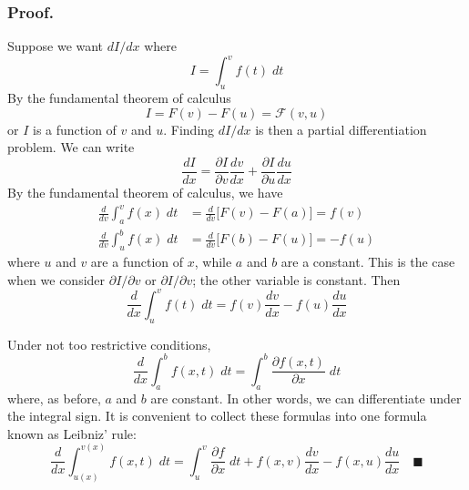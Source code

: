 \documentclass[../../../main.tex]{subfiles}
\begin{document}
\subsubsection{Proof.} Suppose we want $dI/dx$ where
\begin{equation*}
    I=\int_{u }^{v }f(t)\;dt
\end{equation*}
By the fundamental theorem of calculus
\begin{equation*}
    I=F(v)-F(u)=\mathcal{F}(v,u)
\end{equation*}
or $I$ is a function of $v$ and $u$. Finding $dI/dx$ is then a partial diﬀerentiation problem. We can write
\begin{equation*}
    \frac{dI}{dx}=\frac{\partial I}{\partial v}\frac{dv}{dx}+\frac{\partial I}{\partial u}\frac{du}{dx}
\end{equation*}
By the fundamental theorem of calculus, we have
\begin{align*}
    \frac{d}{dv}\int_{a}^{v}f(x)\;dt & =\frac{d}{dv}\bigl[F(v)-F(a)\bigr]=f(v)  \\
    \frac{d}{dv}\int_{u}^{b}f(x)\;dt & =\frac{d}{dv}\bigl[F(b)-F(u)\bigr]=-f(u)
\end{align*}
where $u$ and $v$ are a function of $x$, while $a$ and $b$ are a constant. This is the case when we consider $\partial I/\partial v$ or $\partial I/\partial v$; the other variable is constant. Then
\begin{equation*}
    \frac{d}{dx}\int_{u }^{v }f(t)\;dt=f(v)\frac{dv}{dx}-f(u)\frac{du}{dx}
\end{equation*}

Under not too restrictive conditions,
\begin{equation*}
    \frac{d}{dx}\int_{a }^{b }f(x,t)\;dt =\int_{a }^{b }\frac{\partial f(x,t)}{\partial x}\;dt
\end{equation*}
where, as before, $a$ and $b$ are constant. In other words, we can differentiate under the integral sign. It is convenient to collect these formulas into one formula known as Leibniz' rule:
\begin{equation*}
    \frac{d}{dx}\int_{u(x)}^{v(x)}f(x,t)\;dt=\int_{u}^{v}\frac{\partial f}{\partial x}\;dt + f(x,v)\frac{dv}{dx}-f(x,u)\frac{du}{dx}\quad\blacksquare
\end{equation*}
\end{document}
